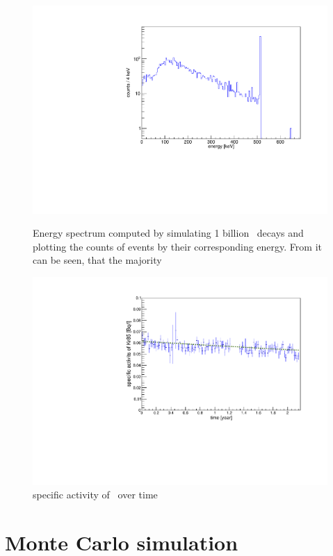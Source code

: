 \documentclass[encoding=utf8,british]{tumphthesis}
\begin{document}
\begin{figure}[t!]
	\centering
	\begin{minipage}{.5\textwidth}
		\centering
		\includegraphics[width=\textwidth]{./Bilder/Sim1Phasenraum.pdf}
		\caption{
			Energy spectrum computed by simulating 1 billion \Kr\ decays and plotting the counts of events by their corresponding energy.
			From it can be seen, that the majority 
			}
		\label{fig:Sim1Spektrum}
	\end{minipage}\hfill%
	\begin{minipage}{.5\textwidth}
		\centering
		\includegraphics[width=\textwidth]{./Bilder/Aktivitaet.pdf}
		\caption{specific activity of \Kr\ over time}
		\label{fig:activity}
	\end{minipage}
\end{figure}
\section{Monte Carlo simulation}
\label{sec:MonteCarlo2}
\end{document}
